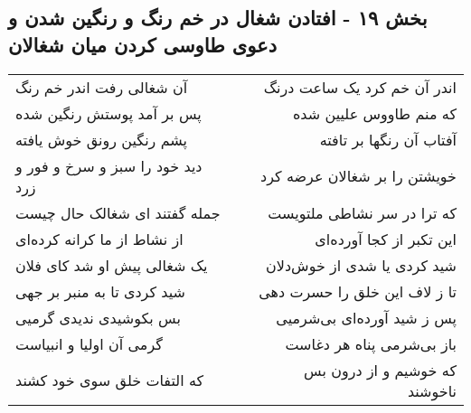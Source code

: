 \begin{center}
\section*{بخش ۱۹ - افتادن شغال در خم رنگ و رنگین شدن و دعوی طاوسی کردن میان شغالان}
\label{sec:sh019}
\begin{longtable}{l p{0.5cm} r}
آن شغالی رفت اندر خم رنگ
&&
اندر آن خم کرد یک ساعت درنگ
\\
پس بر آمد پوستش رنگین شده
&&
که منم طاووس علیین شده
\\
پشم رنگین رونق خوش یافته
&&
آفتاب آن رنگها بر تافته
\\
دید خود را سبز و سرخ و فور و زرد
&&
خویشتن را بر شغالان عرضه کرد
\\
جمله گفتند ای شغالک حال چیست
&&
که ترا در سر نشاطی ملتویست
\\
از نشاط از ما کرانه کرده‌ای
&&
این تکبر از کجا آورده‌ای
\\
یک شغالی پیش او شد کای فلان
&&
شید کردی یا شدی از خوش‌دلان
\\
شید کردی تا به منبر بر جهی
&&
تا ز لاف این خلق را حسرت دهی
\\
بس بکوشیدی ندیدی گرمیی
&&
پس ز شید آورده‌ای بی‌شرمیی
\\
گرمی آن اولیا و انبیاست
&&
باز بی‌شرمی پناه هر دغاست
\\
که التفات خلق سوی خود کشند
&&
که خوشیم و از درون بس ناخوشند
\\
\end{longtable}
\end{center}
